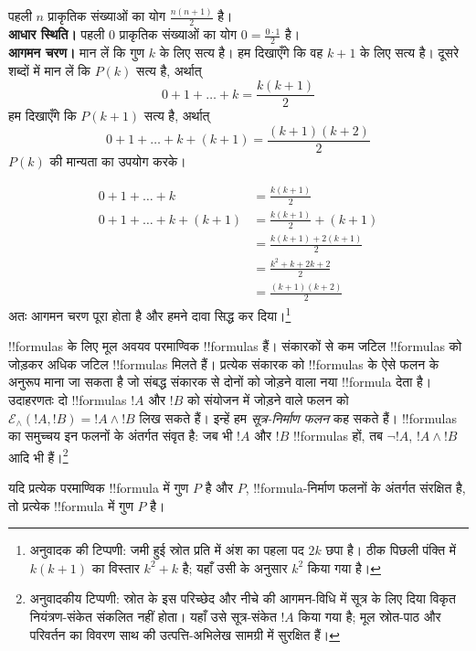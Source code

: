 \documentclass[../../include/open-logic-section]{subfiles}
\begin{document}
\begin{ex} पहली $n$ प्राकृतिक संख्याओं का योग $\frac{n(n+1)}{2}$ है। \\

\textbf{आधार स्थिति।} पहली 0 प्राकृतिक संख्याओं का योग $0=
\frac{0\cdot 1}{2}$ है।\\

\textbf{आगमन चरण।} मान लें कि गुण $k$ के लिए सत्य है। हम दिखाएँगे कि वह
$k+1$ के लिए सत्य है। दूसरे शब्दों में मान लें कि $P(k)$ सत्य है, अर्थात्
\[ 0 + 1 + \ldots + k = \frac{k(k+1)}{2} \]
हम दिखाएँगे कि $P(k+1)$ सत्य है, अर्थात्
\[ 0 + 1 + \ldots + k + (k+1) = \frac{(k+1)(k+2)}{2} \]
$P(k)$ की मान्यता का उपयोग करके।

\begin{align*}
0 + 1 + \ldots + k &= \frac{k(k+1)}{2} \tag{मान्यता} \\
0 + 1 + \ldots + k + (k+1) &= \frac{k(k+1)}{2} + (k+1)
\tag{दोनों पक्षों में $k+1$ जोड़ें} \\
&= \frac{k(k+1) + 2(k+1)}{2} \\
&= \frac{k^2 + k + 2k +2}{2} \\
&=\frac{(k+1)(k+2)}{2}
\end{align*}
अतः आगमन चरण पूरा होता है और हमने दावा सिद्ध कर दिया।\footnote{अनुवादक की
टिप्पणी: जमी हुई स्रोत प्रति में अंश का पहला पद $2k$ छपा है। ठीक पिछली
पंक्ति में $k(k+1)$ का विस्तार $k^2+k$ है; यहाँ उसी के अनुसार $k^2$ किया गया है।}
\end{ex}

\begin{explain}
!!{formula}s के लिए मूल अवयव परमाण्विक !!{formula}s हैं। संकारकों से कम
जटिल !!{formula}s को जोड़कर अधिक जटिल !!{formula}s मिलते हैं। प्रत्येक
संकारक को !!{formula}s के ऐसे फलन के अनुरूप माना जा सकता है जो संबद्ध संकारक
से दोनों को जोड़ने वाला नया !!{formula} देता है। उदाहरणतः दो !!{formula}s
$!A$ और $!B$ को संयोजन में जोड़ने वाले फलन को $\mathcal E _\land (!A,
!B) = !A \land !B$ लिख सकते हैं। इन्हें हम \emph{सूत्र-निर्माण फलन} कह
सकते हैं। !!{formula}s का समुच्चय इन फलनों के अंतर्गत संवृत है: जब भी $!A$
और $!B$ !!{formula}s हों, तब $\lnot !A$, $!A \land !B$ आदि भी हैं।\footnote{अनुवादकीय
टिप्पणी: स्रोत के इस परिच्छेद और नीचे की आगमन-विधि में सूत्र के लिए दिया
विकृत नियंत्रण-संकेत संकलित नहीं होता। यहाँ उसे सूत्र-संकेत $!A$ किया गया है;
मूल स्रोत-पाठ और परिवर्तन का विवरण साथ की उत्पत्ति-अभिलेख सामग्री में सुरक्षित हैं।}
\end{explain}

\begin{defn}
यदि प्रत्येक परमाण्विक !!{formula} में गुण $P$ है और $P$, !!{formula}-निर्माण
फलनों के अंतर्गत संरक्षित है, तो प्रत्येक !!{formula} में गुण $P$ है।
\end{defn}
\end{document}
